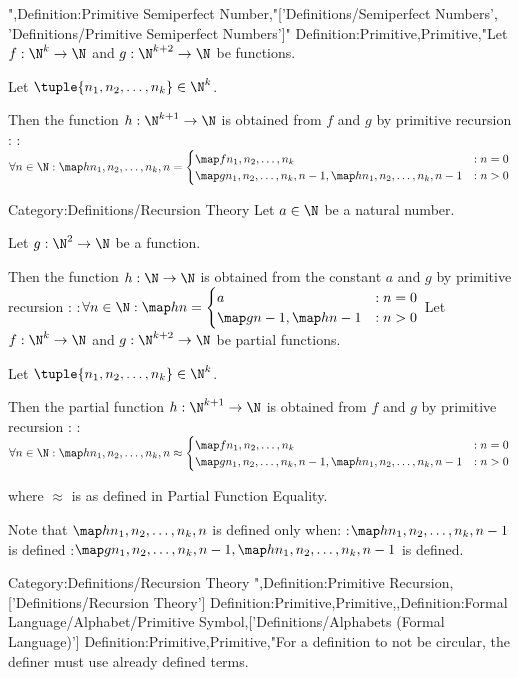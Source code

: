 ",Definition:Primitive Semiperfect Number,"['Definitions/Semiperfect Numbers', 'Definitions/Primitive Semiperfect Numbers']"
Definition:Primitive,Primitive,"Let $f: \N^k \to \N$ and $g: \N^{k + 2} \to \N$ be functions.

Let $\tuple {n_1, n_2, \ldots, n_k} \in \N^k$.

Then the function $h: \N^{k + 1} \to \N$ is obtained from $f$ and $g$ by primitive recursion :
:$\forall n \in \N: \map h {n_1, n_2, \ldots, n_k, n} = \begin {cases}
\map f {n_1, n_2, \ldots, n_k} & : n = 0 \\
\map g {n_1, n_2, \ldots, n_k, n - 1, \map h {n_1, n_2, \ldots, n_k, n - 1} } & : n > 0 
\end {cases}$


Category:Definitions/Recursion Theory
Let $a \in \N$ be a natural number.

Let $g: \N^2 \to \N$ be a function.

Then the function $h: \N \to \N$ is obtained from the constant $a$ and $g$ by primitive recursion :
:$\forall n \in \N: \map h n = \begin {cases}
a & : n = 0 \\
\map g {n - 1, \map h {n - 1} } & : n > 0 
\end{cases}$
Let $f: \N^k \to \N$ and $g: \N^{k+2} \to \N$ be partial functions.

Let $\tuple {n_1, n_2, \ldots, n_k} \in \N^k$.

Then the partial function $h: \N^{k + 1} \to \N$ is obtained from $f$ and $g$ by primitive recursion :
:$\forall n \in \N: \map h {n_1, n_2, \ldots, n_k, n} \approx \begin {cases}
\map f {n_1, n_2, \ldots, n_k} & : n = 0 \\
\map g {n_1, n_2, \ldots, n_k, n - 1, \map h {n_1, n_2, \ldots, n_k, n - 1} } & : n > 0 
\end{cases}$

where $\approx$ is as defined in Partial Function Equality.


Note that $\map h {n_1, n_2, \ldots, n_k, n}$ is defined only when:
:$\map h {n_1, n_2, \ldots, n_k, n - 1}$ is defined
:$\map g {n_1, n_2, \ldots, n_k, n - 1, \map h {n_1, n_2, \ldots, n_k, n - 1} }$ is defined.


Category:Definitions/Recursion Theory
",Definition:Primitive Recursion,['Definitions/Recursion Theory']
Definition:Primitive,Primitive,,Definition:Formal Language/Alphabet/Primitive Symbol,['Definitions/Alphabets (Formal Language)']
Definition:Primitive,Primitive,"For a definition to not be circular, the definer must use already defined terms. 

